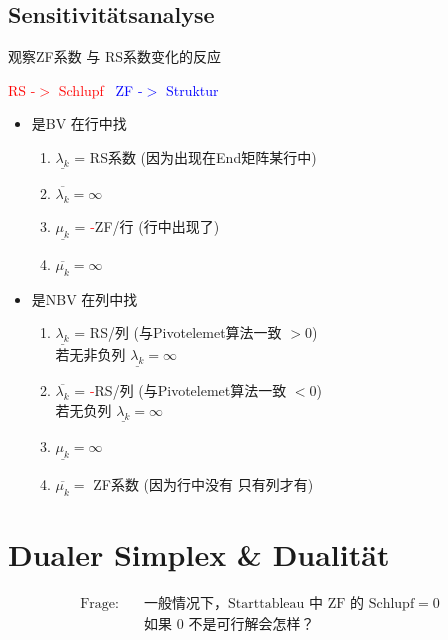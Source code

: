 \documentclass[12pt, letterpaper]{article}
\begin{document}
\begin{CJK*}{UTF8}{gbsn}
\begin{itemize}
\end{itemize}

\subsection{Sensitivitätsanalyse}
观察ZF系数 与 RS系数变化的反应
\begin{center}
\textcolor{red}{RS -$>$ Schlupf} \ \textcolor{blue}{ZF -$>$ Struktur}
\end{center}

\begin{itemize}
\item 是BV 在行中找
\begin{enumerate}
\item $\underline{\lambda_k}$ = RS系数 (因为出现在End矩阵某行中)
\item $\overline{\lambda_k} = \infty$ 

\item $\underline{\mu_k}$ = \textcolor{red}{-}ZF/行 (行中出现了)
\item$\overline{\mu_k} = \infty$


\end{enumerate}

\item 是NBV 在列中找
\begin{enumerate}
\item $\underline{\lambda_k}$ = RS/列 (与Pivotelemet算法一致 $>0$) \\
若无非负列 $\underline{\lambda_k} = \infty$ 
\item $\overline{\lambda_k}$ = \textcolor{red}{-}RS/列 (与Pivotelemet算法一致 $<0$)\\若无负列 $\underline{\lambda_k} = \infty$ 

\item $\underline{\mu_k} = \infty$ 
\item  $\overline{\mu_k} = $ ZF系数 (因为行中没有 只有列才有)

\end{enumerate}
\end{itemize}


\newpage
\section{Dualer Simplex \& Dualität}

\begin{align*}
\text{Frage:} &\quad \text{一般情况下，Starttableau 中 ZF 的 Schlupf} = 0 \\
&\quad \text{如果 } 0 \text{ 不是可行解会怎样？}
\end{align*}


\end{CJK*}
\end{document}
